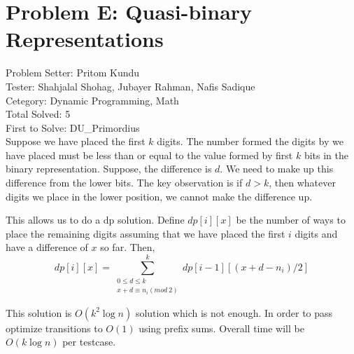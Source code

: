 \section*{Problem E: Quasi-binary Representations}
Problem Setter: Pritom Kundu \\
Tester: Shahjalal Shohag, Jubayer Rahman, Nafis Sadique \\
Cetegory: Dynamic Programming, Math \\
Total Solved: 5 \\
First to Solve: DU\_Primordius \\

Suppose we have placed the first $k$ digits. The number formed the digits by we have placed must be less than or equal to the value formed by first $k$ bits in the binary representation. Suppose, the difference is $d$. We need to make up this difference from the lower bits. The key observation is if $d > k$, then whatever digits we place in the lower position, we cannot make the difference up.

This allows us to do a dp solution. Define $dp[i][x]$ be the number of ways to place the remaining digits assuming that we have placed the first $i$ digits and have a difference of $x$ so far. Then, 
$$dp[i][x] = \sum_{\substack{0 \leq d \leq k \\ x+d \equiv n_i (mod\ 2)}}^{k}dp[i-1][(x+d-n_i)/2]$$

This solution is $O(k^2 \log n ) $ solution which is not enough. In order to pass optimize transitions to $O(1)$ using prefix sums. Overall time will be $O(k \log n)$ per testcase.
